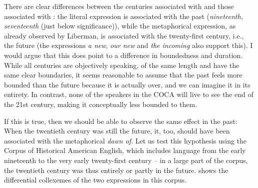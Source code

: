 There are clear differences between the centuries associated with  and those associated  with : the literal  expression is associated with the past (\textit{nineteenth}, \textit{seventeenth} (just below significance)), while the metaphorical  expression, as already observed by Liberman, is associated with the twenty\hyp{}first century, i.e., the future (the expressions \textit{a new}, \textit{our new} and \textit{the incoming} also support this). I would argue that this does point to a difference in boundedness and duration. While all centuries are objectively speaking, of the same length and have the same clear boundaries, it seems reasonable to assume that the past feels more bounded than the future because it is actually over, and we can imagine it in its entirety. In contrast, none of the speakers in the COCA will live to see the end of the 21st century, making it conceptually less bounded to them.\largerpage

If this is true, then we should be able to observe the same effect in the past: When the twentieth century was still the future, it, too, should have been associated  with the metaphorical  \textit{dawn of}. Let us test this hypothesis using the Corpus of Historical American English, which includes language from the early nineteenth to the very early twenty\hyp{}first century -- in a large part of the corpus, the twentieth century was thus entirely or partly in the future.  shows the differential collexemes  of the two expressions in this corpus.

